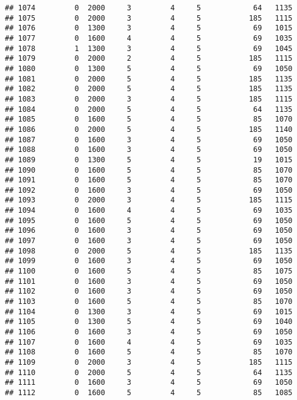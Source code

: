 \documentclass[]{article}
\begin{document}
\begin{verbatim}
## 1074         0  2000     3         4     5            64   1135
## 1075         0  2000     3         4     5           185   1115
## 1076         0  1300     3         4     5            69   1015
## 1077         0  1600     4         4     5            69   1035
## 1078         1  1300     3         4     5            69   1045
## 1079         0  2000     2         4     5           185   1115
## 1080         0  1300     5         4     5            69   1050
## 1081         0  2000     5         4     5           185   1135
## 1082         0  2000     5         4     5           185   1135
## 1083         0  2000     3         4     5           185   1115
## 1084         0  2000     5         4     5            64   1135
## 1085         0  1600     5         4     5            85   1070
## 1086         0  2000     5         4     5           185   1140
## 1087         0  1600     3         4     5            69   1050
## 1088         0  1600     3         4     5            69   1050
## 1089         0  1300     5         4     5            19   1015
## 1090         0  1600     5         4     5            85   1070
## 1091         0  1600     5         4     5            85   1070
## 1092         0  1600     3         4     5            69   1050
## 1093         0  2000     3         4     5           185   1115
## 1094         0  1600     4         4     5            69   1035
## 1095         0  1600     5         4     5            69   1050
## 1096         0  1600     3         4     5            69   1050
## 1097         0  1600     3         4     5            69   1050
## 1098         0  2000     5         4     5           185   1135
## 1099         0  1600     3         4     5            69   1050
## 1100         0  1600     5         4     5            85   1075
## 1101         0  1600     3         4     5            69   1050
## 1102         0  1600     3         4     5            69   1050
## 1103         0  1600     5         4     5            85   1070
## 1104         0  1300     3         4     5            69   1015
## 1105         0  1300     5         4     5            69   1040
## 1106         0  1600     3         4     5            69   1050
## 1107         0  1600     4         4     5            69   1035
## 1108         0  1600     5         4     5            85   1070
## 1109         0  2000     3         4     5           185   1115
## 1110         0  2000     5         4     5            64   1135
## 1111         0  1600     3         4     5            69   1050
## 1112         0  1600     5         4     5            85   1085

\end{verbatim}
\end{document}

